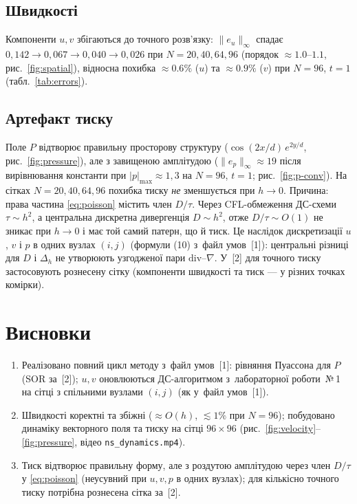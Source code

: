 \documentclass[14pt,a4paper,extarticle]{extarticle}
\newcommand{\lrcond}{файл умов~[1]}
\newcommand{\lrone}{лабораторної роботи~№\,1}
\begin{document}
\subsection{Швидкості}

Компоненти $u,v$ збігаються до точного розв'язку:
$\|e_u\|_\infty$ спадає $0{,}142\to0{,}067\to0{,}040\to0{,}026$ при $N=20,40,64,96$
(порядок $\approx1.0$--$1.1$, рис.~\ref{fig:spatial}), відносна похибка $\approx0.6\%$
($u$) та $\approx0.9\%$ ($v$) при $N=96$, $t=1$ (табл.~\ref{tab:errors}).

\subsection{Артефакт тиску}

Поле $P$ відтворює правильну просторову структуру ($\cos(2x/d)\,e^{2y/d}$,
рис.~\ref{fig:pressure}), але з завищеною амплітудою ($\|e_p\|_\infty\approx19$
після вирівнювання константи при $|p|_{\max}\approx1{,}3$ на $N=96$, $t=1$;
рис.~\ref{fig:p-conv}). На сітках $N=20,40,64,96$ похибка тиску \emph{не}
зменшується при $h\to0$. Причина: права частина \eqref{eq:poisson} містить член $D/\tau$. Через
CFL-обмеження ДС-схеми $\tau\sim h^2$, а центральна дискретна дивергенція
$D\sim h^2$, отже $D/\tau\sim O(1)$ не зникає при $h\to0$ і має той самий
патерн, що й тиск. Це наслідок дискретизації $u$, $v$ і $p$ в одних вузлах
$(i,j)$ (формули (10) з~\lrcond{}): центральні різниці для $D$ і $\Delta_h$
не утворюють узгодженої пари $\mathrm{div}$--$\nabla$. У~[2] для точного
тиску застосовують рознесену сітку (компоненти швидкості та тиск --- у
різних точках комірки).

\section{Висновки}

\begin{enumerate}
  \item Реалізовано повний цикл методу з~\lrcond{}: рівняння Пуассона для $P$
        (SOR за~[2]); $u,v$ оновлюються ДС-алгоритмом з~\lrone{} на сітці з
        спільними вузлами $(i,j)$ (як у~\lrcond{}).
  \item Швидкості коректні та збіжні ($\approx O(h)$, $\lesssim1\%$ при
        $N=96$); побудовано динаміку векторного поля та тиску на сітці $96\times96$
        (рис.~\ref{fig:velocity}--\ref{fig:pressure}, відео \texttt{ns\_dynamics.mp4}).
  \item Тиск відтворює правильну форму, але з роздутою амплітудою через
        член $D/\tau$ у \eqref{eq:poisson} (неусувний при $u,v,p$ в одних
        вузлах); для кількісно точного тиску потрібна рознесена сітка за~[2].
\end{enumerate}
\end{document}
